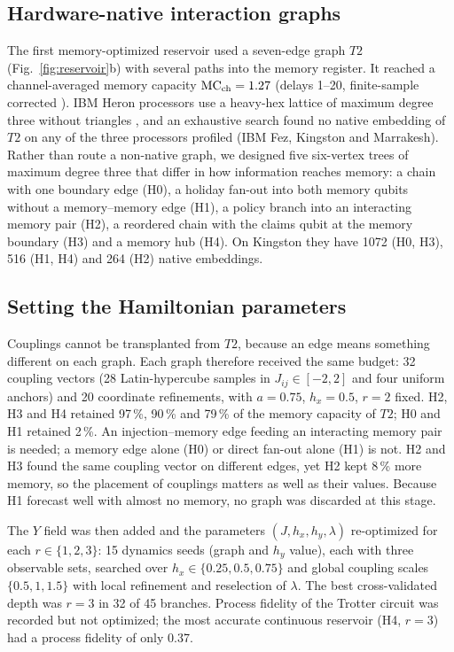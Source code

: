 \documentclass[journal]{IEEEtran}
\begin{document}
\subsection{Hardware-native interaction graphs}
The first memory-optimized reservoir used a seven-edge graph $T2$ (Fig.~\ref{fig:reservoir}b) with several paths into the memory register. It reached a channel-averaged memory capacity $\mathrm{MC}_{\rm ch}=1.27$ (delays 1--20, finite-sample corrected \cite{Dambre2012Capacity}). IBM Heron processors use a heavy-hex lattice of maximum degree three without triangles \cite{Chamberland2020HeavyHex}, and an exhaustive search found no native embedding of $T2$ on any of the three processors profiled (IBM Fez, Kingston and Marrakesh). Rather than route a non-native graph, we designed five six-vertex trees of maximum degree three that differ in how information reaches memory: a chain with one boundary edge (H0), a holiday fan-out into both memory qubits without a memory--memory edge (H1), a policy branch into an interacting memory pair (H2), a reordered chain with the claims qubit at the memory boundary (H3) and a memory hub (H4). On Kingston they have 1072 (H0, H3), 516 (H1, H4) and 264 (H2) native embeddings.

\subsection{Setting the Hamiltonian parameters}
Couplings cannot be transplanted from $T2$, because an edge means something different on each graph. Each graph therefore received the same budget: 32 coupling vectors (28 Latin-hypercube samples in $J_{ij}\in[-2,2]$ and four uniform anchors) and 20 coordinate refinements, with $a=0.75$, $h_x=0.5$, $r=2$ fixed. H2, H3 and H4 retained 97\,\%, 90\,\% and 79\,\% of the memory capacity of $T2$; H0 and H1 retained 2\,\%. An injection--memory edge feeding an interacting memory pair is needed; a memory edge alone (H0) or direct fan-out alone (H1) is not. H2 and H3 found the same coupling vector on different edges, yet H2 kept 8\,\% more memory, so the placement of couplings matters as well as their values. Because H1 forecast well with almost no memory, no graph was discarded at this stage.

The $Y$ field was then added and the parameters $(J,h_x,h_y,\lambda)$ re-optimized for each $r\in\{1,2,3\}$: 15 dynamics seeds (graph and $h_y$ value), each with three observable sets, searched over $h_x\in\{0.25,0.5,0.75\}$ and global coupling scales $\{0.5,1,1.5\}$ with local refinement and reselection of $\lambda$. The best cross-validated depth was $r=3$ in 32 of 45 branches. Process fidelity of the Trotter circuit was recorded but not optimized; the most accurate continuous reservoir (H4, $r=3$) had a process fidelity of only 0.37.
\end{document}
